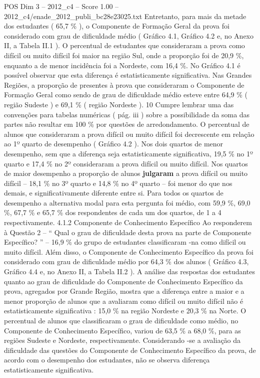 \begin{textsample}{POS Dim 3 – 2012\_c4 – Score 1.00 – 2012\_c4/enade\_2012\_publi\_bc28e23025.txt}
Entretanto, para mais da metade dos estudantes ( 65,7 \% ), o Componente de Formação Geral da prova foi considerado com grau de dificuldade médio ( Gráfico 4.1, Gráfico 4.2 e, no Anexo II, a Tabela II.1 ).
O percentual de estudantes que consideraram a prova como difícil ou muito difícil foi maior na região Sul, onde a proporção foi de 20,9 \%, enquanto a de menor incidência foi a Nordeste, com 16,4 \%.
No Gráfico 4.1 é possível observar que esta diferença é estatisticamente significativa.
Nas Grandes Regiões, a proporção de presentes à prova que consideraram o Componente de Formação Geral como sendo de grau de dificuldade médio esteve entre 64,9 \% ( região Sudeste ) e 69,1 \% ( região Nordeste ). 10 Cumpre lembrar uma das convenções para tabelas numéricas ( pág. iii ) sobre a possibilidade da soma das partes não resultar em 100 \% por questões de arredondamento.
O percentual de alunos que consideraram a prova difícil ou muito difícil foi decrescente em relação ao 1º quarto de desempenho ( Gráfico 4.2 ).
Nos dois quartos de menor desempenho, sem que a diferença seja estatisticamente significativa, 19,5 \% no 1º quarto e 17,4 \% no 2º consideraram a prova difícil ou muito difícil.
Nos quartos de maior desempenho a proporção de alunos \textbf{julgaram} a prova difícil ou muito difícil – 18,1 \% no 3º quarto e 14,8 \% no 4º quarto – foi menor do que nos demais, e significativamente diferente entre si.
Para todos os quartos de desempenho a alternativa modal para esta pergunta foi médio, com 59,9 \%, 69,0 \%, 67,7 \% e 65,7 \% dos respondentes de cada um dos quartos, de 1 a 4 respectivamente. 4.1.2 Componente de Conhecimento Específico Ao responderem à Questão 2 – “ Qual o grau de dificuldade desta prova na parte de Componente Específico? ” – 16,9 \% do grupo de estudantes classificaram -na como difícil ou muito difícil.
Além disso, o Componente de Conhecimento Específico da prova foi considerado com grau de dificuldade médio por 64,3 \% dos alunos ( Gráfico 4.3, Gráfico 4.4 e, no Anexo II, a Tabela II.2 ).
A análise das respostas dos estudantes quanto ao grau de dificuldade do Componente de Conhecimento Específico da prova, agregados por Grande Região, mostra que a diferença entre a maior e a menor proporção de alunos que a avaliaram como difícil ou muito difícil não é estatisticamente significativa : 15,0 \% na região Nordeste e 20,3 \% na Norte.
O percentual de alunos que classificaram o grau de dificuldade como médio, no Componente de Conhecimento Específico, variou de 63,5 \% a 68,0 \%, para as regiões Sudeste e Nordeste, respectivamente.
Considerando -se a avaliação da dificuldade das questões do Componente de Conhecimento Específico da prova, de acordo com o desempenho dos estudantes, não se observa diferença estatisticamente significativa.

\end{textsample}
